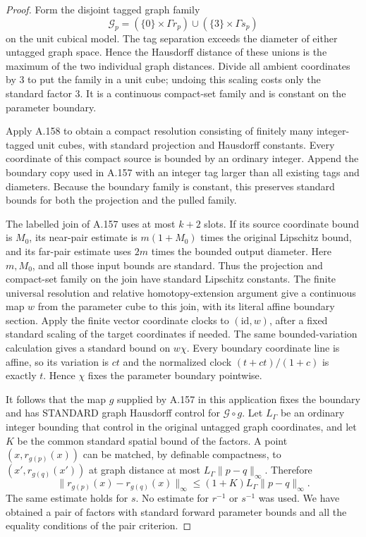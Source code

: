 \begin{proof}
Form the disjoint tagged graph family
\[
 \mathcal G_p=
  (\{0\}\times\Gamma r_p)\cup
  (\{3\}\times\Gamma s_p)
 \tag{159.9}
\]
on the unit cubical model. The tag separation exceeds the
diameter of either untagged graph space. Hence the Hausdorff
distance of these unions is the maximum of the two individual
graph distances. Divide all ambient coordinates by $3$ to put
the family in a unit cube; undoing this scaling costs only the
standard factor $3$. It is a continuous compact-set family and
is constant on the parameter boundary.

Apply A.158 to obtain a compact resolution consisting of
finitely many integer-tagged unit cubes, with standard
projection and Hausdorff constants. Every coordinate of this
compact source is bounded by an ordinary integer. Append the
boundary copy used in A.157 with an integer tag larger than
all existing tags and diameters. Because the boundary family
is constant, this preserves standard bounds for both the
projection and the pulled family.

The labelled join of A.157 uses at most $k+2$ slots. If its
source coordinate bound is $M_0$, its near-pair estimate is
$m(1+M_0)$ times the original Lipschitz bound, and its far-pair
estimate uses $2m$ times the bounded output diameter. Here
$m,M_0$, and all those input bounds are standard. Thus the
projection and compact-set family on the join have standard
Lipschitz constants. The finite universal resolution and
relative homotopy-extension argument give a continuous
map $w$ from the parameter cube to this join, with its literal
affine boundary section. Apply the finite vector coordinate
clocks to $(\mathrm{id},w)$, after a fixed standard scaling of
the target coordinates if needed. The same bounded-variation
calculation gives a standard bound on $w\chi$. Every boundary
coordinate line is affine, so its variation is $ct$ and the
normalized clock $(t+ct)/(1+c)$ is exactly $t$. Hence
$\chi$ fixes the parameter boundary pointwise.

It follows that the map $g$ supplied by A.157 in this
application fixes the boundary and has STANDARD graph
Hausdorff control for $\mathcal G\circ g$. Let $L_\Gamma$
be an ordinary integer bounding that control in the original
untagged graph coordinates, and let $K$ be the common standard
spatial bound of the factors. A point $(x,r_{g(p)}(x))$ can
be matched, by definable compactness, to
$(x',r_{g(q)}(x'))$ at graph distance at most
$L_\Gamma\|p-q\|_\infty$. Therefore
\[
 \|r_{g(p)}(x)-r_{g(q)}(x)\|_\infty
 \le(1+K)L_\Gamma\|p-q\|_\infty.
 \tag{159.10}
\]
The same estimate holds for $s$. No estimate for $r^{-1}$ or
$s^{-1}$ was used. We have obtained a pair of factors with
standard forward parameter bounds and all the equality
conditions of the pair criterion.


\end{proof}
